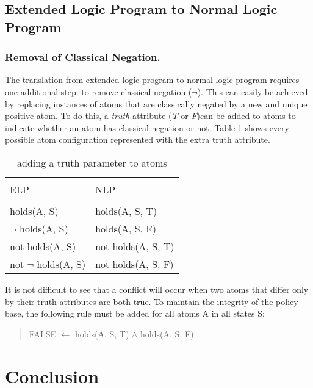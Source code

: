 \documentclass{llncs}
\begin{document}
    \subsection{Extended Logic Program to Normal Logic Program}

      \subsubsection{Removal of Classical Negation.}

        The translation from extended logic program to normal logic program
        requires one additional step: to remove classical negation ($\lnot$).
        This can easily be achieved by replacing instances of atoms that are
        classically negated by a new and unique positive atom. To do this,
        a \emph{truth} attribute (\emph{T} or \emph{F})can be added to atoms
        to indicate whether an atom has classical negation or not. Table 1 shows
        every possible atom configuration represented with the extra truth
        attribute.

        \begin{table}
         \caption{adding a truth parameter to atoms}
          \begin{tabular}{ll}
            \hline \\
            ELP & NLP \\
            \hline \\
            holds(A, S) & holds(A, S, T) \\
            $\lnot$ holds(A, S) & holds(A, S, F) \\
            not holds(A, S) & not holds(A, S, T) \\
            not $\lnot$ holds(A, S) & not holds(A, S, F) \\
            \hline
          \end{tabular}
        \end{table}

        It is not difficult to see that a conflict will occur when two atoms
        that differ only by their truth attributes are both true. To maintain
        the integrity of the policy base, the following rule must be added 
        for all atoms A in all states S:

        \begin{quote}
          FALSE $\leftarrow$ holds(A, S, T) $\land$ holds(A, S, F)
        \end{quote}

  \section{Conclusion}
\end{document}
